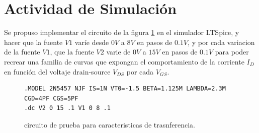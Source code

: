 \section{Actividad de Simulación}
    Se propuso implementar el circuito de la figura \ref{crkt:jfet-transf} en el simulador LTSpice, y hacer que la fuente
    $V1$ varíe desde $0V$ a $8V$ en pasos de $0.1V$, y por cada variacion de la fuente $V1$, que la fuente $V2$ varie de
    $0V$ a $15V$ en pasos de $0.1V$ para poder recrear una familia de curvas que expongan el comportamiento de la
    corriente $I_D$ en función del voltaje drain-source $V_{DS}$ por cada $V_{GS}$.
    \begin{figure}[!ht]
      \centering
      \begin{minipage}{0.45\textwidth}
        \caption{circuito de prueba para caracteristicas de trasnferencia.}
        \label{crkt:jfet-transf}
      \end{minipage}
      \hfill
      \begin{minipage}{0.45\textwidth}
        \begin{lstlisting}[style=ltspice, caption={Parámetros de simulación LTspice}, label=list:jfet-transf]
.MODEL 2N5457 NJF IS=1N VT0=-1.5 BETA=1.125M LAMBDA=2.3M CGD=4PF CGS=5PF
.dc V2 0 15 .1 V1 0 8 .1
        \end{lstlisting}
      \end{minipage}
    \end{figure}
